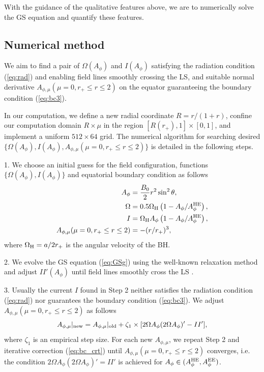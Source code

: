 \documentclass[aps,prd,reprint,nofootinbib, superscriptaddress]{revtex4-1}
\def\sst{\sin^2\theta}
\def\Ap{A_\phi}
\def\Am{A_{\phi,\mu}}
\def\be{\begin{equation}}
\def\ee{\end{equation}}
\def\WH{\Omega_{\rm H}}
\def\AHE{A_\phi^{\rm HE}}
\begin{document}
With the guidance of the qualitative features above, we are to numerically
solve the GS equation and quantify these features.

\subsection{Numerical method}
\label{subsec:algorithm}

We aim to find a pair of $\Omega(A_\phi)$ and $I(A_\phi)$ satisfying the radiation condition (\ref{eq:rad})
and enabling field lines smoothly crossing the LS,
and suitable normal derivative $\Am(\mu =0, r_+\leq r \leq 2)$ on the equator
guaranteeing the boundary condition (\ref{eq:bc3}).

In our computation, we define a new radial coordinate $R=r/(1+r)$, confine our
computation domain $R\times \mu$ in the region $[R(r_+), 1]\times [0,1]$,
and implement a uniform $512\times 64$ grid. The numerical algorithm for
searching desired $\{\Omega(A_\phi), I(A_\phi), \Am(\mu =0, r_+\leq r \leq 2)\}$ is detailed
in the following steps.

1. We choose an initial guess for the field configuration, functions
$\{ \Omega(\Ap), I(\Ap)\}$
and equatorial boundary condition as follows
\begin{subequations}
\begin{align}
    \Ap &= \frac{B_0}{2}r^2 \sst,  \label{eq:gss1} \\
    \Omega & = 0.5\WH\left(1-\Ap/\AHE\right),  \label{eq:gss2}\\
    I & = \WH \Ap\left(1-\Ap/\AHE\right) , \\
    \Am(\mu =0, r_+\leq r \leq 2) & = - (r/r_+)^3, \label{eq:gss3}
\end{align}
\end{subequations}
where $\WH = a/2r_+$ is the angular velocity of the BH.

2. We evolve the GS equation (\ref{eq:GSg}) using the well-known relaxation method \cite{Press1987}
 and adjust $II'(\Ap)$ until  field lines smoothly cross the LS
\cite[see e.g.][for more details]{Contopoulos2013, Nathanail2014, Pan2016a, Mahlmann2018}.

3. Usually the current $I$ found in Step 2 neither satisfies the radiation condition (\ref{eq:rad})
nor guarantees the boundary condition (\ref{eq:bc3}). We  adjust
$\Am(\mu = 0, r_+ \leq r\leq 2)$ as follows
\be
\label{eq:bc_crt}
 A_{\phi,\mu}|_{\rm new}  = A_{\phi,\mu}|_{\rm old} + \zeta_1\times[2\Omega\Ap(2\Omega\Ap)' -II'],
\ee
where $\zeta_1$ is an empirical step size. For each new $A_{\phi,\mu}$, we repeat Step 2 and iterative
correction (\ref{eq:bc_crt}) until $\Am(\mu = 0, r_+ \leq r\leq 2)$ converges, i.e. the condition $2\Omega\Ap(2\Omega\Ap)' = II'$ is
achieved for $A_\phi\in (A_\phi^{\rm HE}, A_\phi^{\rm EE})$.
\end{document}
